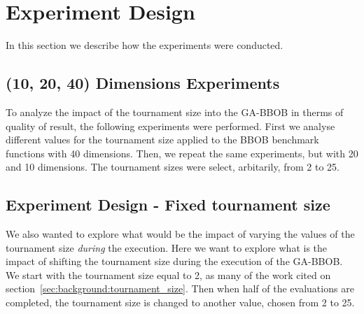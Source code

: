 \section{Experiment Design}

In this section we describe how the experiments were conducted.


\label{sec:experiment}

\subsection{(10, 20, 40) Dimensions Experiments}

To analyze the impact of the tournament size into the GA-BBOB in therms of quality of result, the following experiments were performed. First we analyse different values for the tournament size applied to the BBOB benchmark functions with 40 dimensions. Then, we repeat the same experiments, but with 20 and 10 dimensions.  The tournament sizes were select, arbitarily, from 2 to 25.


\subsection{Experiment Design - Fixed tournament size}

We also wanted to explore what would be the impact of varying the values of the tournament size \textit{during} the execution.
Here we want to explore what is the impact of shifting the tournament size during the execution of the GA-BBOB. We start with the tournament size equal to 2, as many of the work cited on section~\ref{sec:background:tournament_size}. Then when half of the evaluations are completed, the tournament size is changed to another value, chosen from 2 to 25. 


